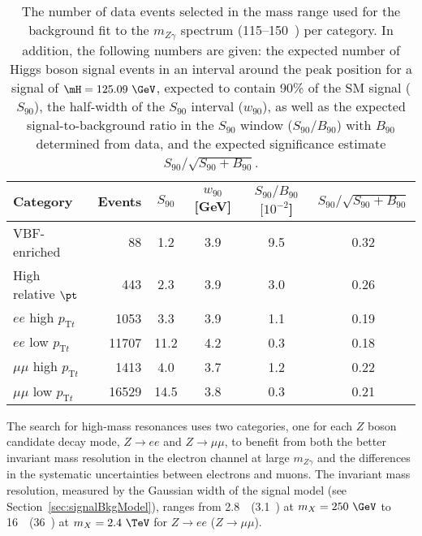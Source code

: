 \begin{table}[htbp]
\caption{The number of data events selected in the mass range used for the background fit to the 
$m_{Z\gamma}$ spectrum (115--150~\GeV) per category. In addition, the following numbers are given:
the expected number of Higgs boson signal events in an interval around the peak position for a signal 
of $\mH=125.09~\GeV$, 
expected to contain 90\% of the SM signal ($S_{90}$), the half-width of the $S_{90}$ interval 
($w_{90}$), as well as
the expected signal-to-background ratio in the $S_{90}$ window ($S_{90}/B_{90}$) with 
$B_{90}$ determined from data, and the expected significance estimate $S_{90}/\sqrt{S_{90}+B_{90}}$.}
\label{tab:SBtable}
\begin{center}
\begin{tabular}{lrSccc}
\hline\hline
                 Category  & Events &  $S_{90}$  & $w_{90}$ [GeV] & $S_{90}/B_{90}$ $[10^{-2}$] & $S_{90}/\sqrt{S_{90}+B_{90}}$\\
\hline
VBF-enriched                 & 88   & 1.2  & 3.9 & 9.5 & 0.32 \\        
High relative $\pt$          & 443   & 2.3  & 3.9 & 3.0 & 0.26  \\         
$ee$ high $p_{\mathrm{T}t}$      & 1053  & 3.3  & 3.9 & 1.1 & 0.19 \\         
$ee$ low $p_{\mathrm{T}t}$       & 11707 & 11.2 & 4.2 & 0.3 & 0.18 \\         
$\mu\mu$ high $p_{\mathrm{T}t}$  & 1413  & 4.0  & 3.7 & 1.2 & 0.22 \\         
$\mu\mu$ low $p_{\mathrm{T}t}$   & 16529 & 14.5 & 3.8 & 0.3 & 0.21 \\         
\hline\hline
\end{tabular}
\end{center}
\end{table}

The search for high-mass resonances uses two categories, one for each $Z$ 
boson candidate decay mode, $Z\to ee$
and $Z\to\mu\mu$, to benefit from both the better invariant mass resolution in the electron channel at 
large $m_{Z\gamma}$ and the differences in the systematic uncertainties between electrons and muons.
The invariant mass resolution, measured by the Gaussian width of the signal model (see Section~\ref{sec:signalBkgModel}),
ranges from 2.8~\GeV\ (3.1~\GeV) at $m_X = 250~\GeV$ to 16~\GeV\ (36~\GeV) at $m_X = 2.4~\TeV$
for $Z\to ee$ ($Z\to\mu\mu$).

